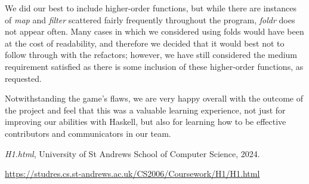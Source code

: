 \documentclass[a4paper,]{article}
\providecommand{\tightlist}{%
  \setlength{\itemsep}{0pt}\setlength{\parskip}{0pt}}
\begin{document}
We did our best to include higher-order functions, but while there are instances of \textit{map} and \textit{filter} scattered fairly frequently throughout the program, \textit{foldr} does not appear often.
Many cases in which we considered using folds would have been at the cost of readability, and therefore we decided that it would best not to follow through with the refactors; however, we have still considered the medium requirement satisfied as there is some inclusion of these higher-order functions, as requested.

Notwithstanding the game's flaws, we are very happy overall with the outcome of the project and feel that this was a valuable learning experience, not just for improving our abilities with Haskell, but also for learning how to be effective contributors and communicators in our team.




\hypertarget{refs}{}
\begin{thebibliography}{99}
        \textit{H1.html},
        University of St Andrews School of Computer Science, 2024.

        \url{https://studres.cs.st-andrews.ac.uk/CS2006/Coursework/H1/H1.html}


\end{thebibliography}
\end{document}
